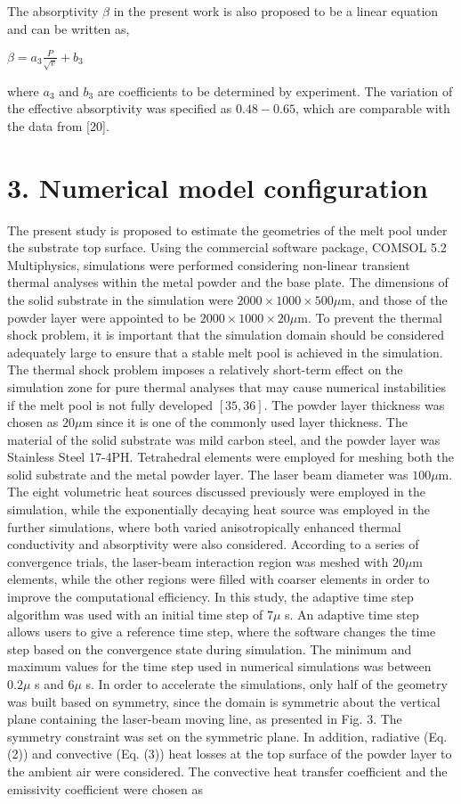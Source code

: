 \documentclass[10pt]{article}
\begin{document}
The absorptivity $\beta$ in the present work is also proposed to be a linear equation and can be written as,

$\beta=a_{3} \frac{P}{\sqrt{v}}+b_{3}$

where $a_{3}$ and $b_{3}$ are coefficients to be determined by experiment. The variation of the effective absorptivity was specified as $0.48-0.65$, which are comparable with the data from [20].

\section*{3. Numerical model configuration}
The present study is proposed to estimate the geometries of the melt pool under the substrate top surface. Using the commercial software package, COMSOL 5.2 Multiphysics, simulations were performed considering non-linear transient thermal analyses within the metal powder and the base plate. The dimensions of the solid substrate in the simulation were $2000 \times 1000 \times 500 \mu \mathrm{m}$, and those of the powder layer were appointed to be $2000 \times 1000 \times 20 \mu \mathrm{m}$. To prevent the thermal shock problem, it is important that the simulation domain should be considered adequately large to ensure that a stable melt pool is achieved in the simulation. The thermal shock problem imposes a relatively short-term effect on the simulation zone for pure thermal analyses that may cause numerical instabilities if the melt pool is not fully developed $[35,36]$. The powder layer thickness was chosen as $20 \mu \mathrm{m}$ since it is one of the commonly used layer thickness. The material of the solid substrate was mild carbon steel, and the powder layer was Stainless Steel 17-4PH. Tetrahedral elements were employed for meshing both the solid substrate and the metal powder layer. The laser beam diameter was $100 \mu \mathrm{m}$. The eight volumetric heat sources discussed previously were employed in the simulation, while the exponentially decaying heat source was employed in the further simulations, where both varied anisotropically enhanced thermal conductivity and absorptivity were also considered. According to a series of convergence trials, the laser-beam interaction region was meshed with $20 \mu \mathrm{m}$ elements, while the other regions were filled with coarser elements in order to improve the computational efficiency. In this study, the adaptive time step algorithm was used with an initial time step of $7 \mu$ s. An adaptive time step allows users to give a reference time step, where the software changes the time step based on the convergence state during simulation. The minimum and maximum values for the time step used in numerical simulations was between $0.2 \mu$ s and $6 \mu$ s. In order to accelerate the simulations, only half of the geometry was built based on symmetry, since the domain is symmetric about the vertical plane containing the laser-beam moving line, as presented in Fig. 3. The symmetry constraint was set on the symmetric plane. In addition, radiative (Eq. (2)) and convective (Eq. (3)) heat losses at the top surface of the powder layer to the ambient air were considered. The convective heat transfer coefficient and the emissivity coefficient were chosen as 
\end{document}
